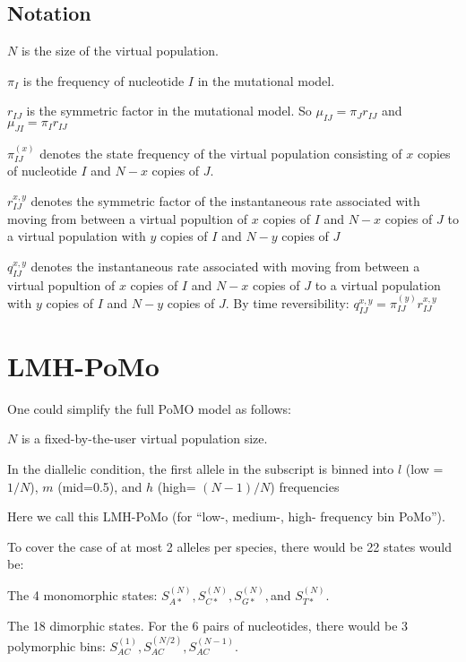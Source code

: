 \documentclass{llncs}
\begin{document}
\subsection*{Notation}
\begin{compactenum}
    \item $N$ is the size of the virtual population.
    \item $\pi_I$ is the frequency of nucleotide $I$ in the mutational model.
    \item $r_{IJ}$ is the symmetric factor in the mutational model. So $\mu_{IJ} = \pi_J r_{IJ}$ and $\mu_{JI} = \pi_I r_{IJ}$
    \item $\pi_{IJ}^{(x)}$ denotes the state frequency of the virtual population consisting of  $x$ copies of nucleotide $I$ and $N-x$ copies of $J$.
    \item $r_{IJ}^{x,y}$ denotes the symmetric factor of the instantaneous rate associated
    with moving from between a virtual popultion of $x$ copies of $I$ and $N-x$ copies of 
    $J$ to a virtual population with $y$ copies of $I$ and $N-y$ copies of $J$
    \item $q_{IJ}^{x,y}$ denotes the instantaneous rate associated
    with moving from between a virtual popultion of $x$ copies of $I$ and $N-x$ copies of 
    $J$ to a virtual population with $y$ copies of $I$ and $N-y$ copies of $J$.
    By time reversibility: $q_{IJ}^{x,y} = \pi_{IJ}^{(y)}r_{IJ}^{x,y}$
\end{compactenum}

\section*{LMH-PoMo}
One could simplify the full PoMO model as follows:
\begin{compactenum}
    \item $N$ is a fixed-by-the-user virtual population size.
    \item In the diallelic condition, the first allele in the subscript is binned into $l$ (low = $1/N$), $m$ (mid=0.5), and $h$ (high= $(N-1)/N$) frequencies
\end{compactenum}
Here we call this LMH-PoMo (for ``low-, medium-, high- frequency bin PoMo'').



To cover the case of at most 2 alleles per species, there would be 22 states would be:
\begin{compactenum}
    \item The 4 monomorphic states: $S_{A\ast}^{(N)}, S_{C\ast}^{(N)}, S_{G\ast}^{(N)}, $and $ S_{T\ast}^{(N)}$.
    \item The 18 dimorphic states. For the 6 pairs of nucleotides, there would be 3 polymorphic bins: $S_{AC}^{(1)}, S_{AC}^{(N/2)}, S_{AC}^{(N-1)}$.
\end{compactenum}
\end{document}
